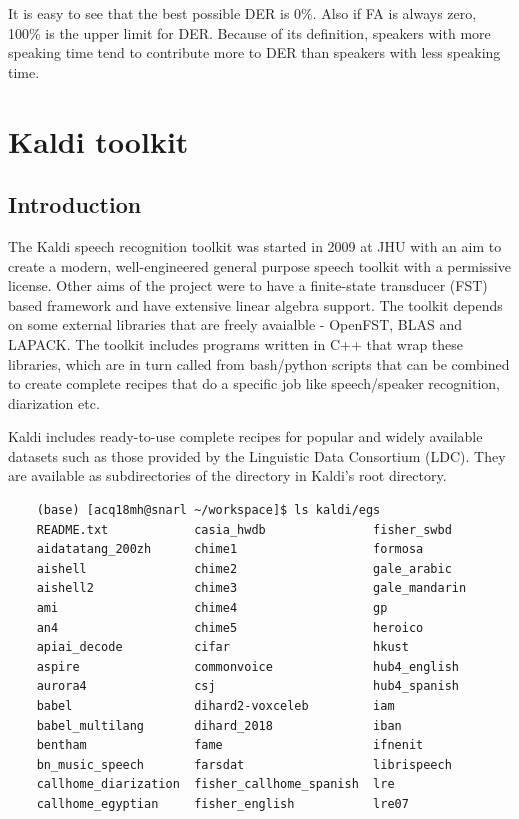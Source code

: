 		It is easy to see that the best possible DER is 0\%. Also if FA is always zero, 100\% is the upper limit for DER. Because of its definition, speakers with more speaking time tend to contribute more to DER than speakers with less speaking time.

\section{Kaldi toolkit}
	\subsection{Introduction}
	The Kaldi speech recognition toolkit \cite{povey2011kaldi} was started in 2009 at JHU with an aim to create a modern, well-engineered general purpose speech toolkit with a permissive license. Other aims of the project were to have a finite-state transducer (FST) based framework and have extensive linear algebra support. The toolkit depends on some external libraries that are freely avaialble - OpenFST, BLAS and LAPACK. The toolkit includes programs written in C++ that wrap these libraries, which are in turn called from bash/python scripts that can be combined to create complete recipes that do a specific job like speech/speaker recognition, diarization etc.
	
	Kaldi includes ready-to-use complete recipes for popular and widely available datasets such as those provided by the Linguistic Data Consortium (LDC). They are available as subdirectories of the  directory in Kaldi's root directory.
	
	\begin{verbatim}
	(base) [acq18mh@snarl ~/workspace]$ ls kaldi/egs
	README.txt            casia_hwdb               fisher_swbd
	aidatatang_200zh      chime1                   formosa
	aishell               chime2                   gale_arabic
	aishell2              chime3                   gale_mandarin
	ami                   chime4                   gp
	an4                   chime5                   heroico
	apiai_decode          cifar                    hkust
	aspire                commonvoice              hub4_english
	aurora4               csj                      hub4_spanish
	babel                 dihard2-voxceleb         iam
	babel_multilang       dihard_2018              iban
	bentham               fame                     ifnenit
	bn_music_speech       farsdat                  librispeech
	callhome_diarization  fisher_callhome_spanish  lre
	callhome_egyptian     fisher_english           lre07
	\end{verbatim}
	
